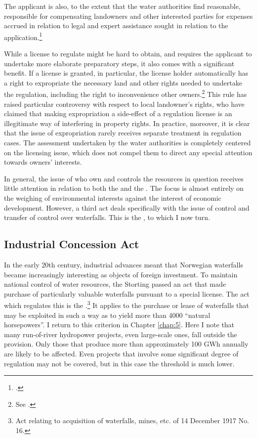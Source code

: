 The applicant is also, to the extent that the water authorities find reasonable, responsible for compensating landowners and other interested parties for expenses accrued in relation to legal and expert assistance sought in relation to the application.\footcite[6]{wra17} 

While a license to regulate might be hard to obtain, and requires the applicant to undertake more elaborate preparatory steps, it also comes with a significant benefit. If a license is granted, in particular, the license holder automatically has a right to expropriate the necessary land and other rights needed to undertake the regulation, including the right to inconvenience other owners.\footnote{See \cite[16]{wra17}.} This rule has raised particular controversy with respect to local landowner's rights, who have claimed that making expropriation a side-effect of a regulation license is an illegitimate way of interfering in property rights. In practice, moreover, it is clear that the issue of expropriation rarely receives separate treatment in regulation cases. The assessment undertaken by the water authorities is completely centered on the licensing issue, which does not compel them to direct any special attention towards owners' interests. 

In general, the issue of who own and controls the resources in question receives little attention in relation to both the \cite{wwra17} and the \cite{wra00}. The focus is almost entirely on the weighing of environmental interests against the interest of economic development. However, a third act deals specifically with the issue of control and transfer of control over waterfalls. This is the \cite{ica17}, to which I now turn. 

\subsection{Industrial Concession Act}

In the early 20th century, industrial advances meant that Norwegian waterfalls became increasingly interesting as objects of foreign investment. To maintain national control of water resources, the Storting passed an act that made purchase of particularly valuable waterfalls pursuant to a special license. The act which regulates this is the \cite{ica17}.\footnote{Act relating to acquisition of waterfalls, mines, etc. of 14 December 1917 No. 16.} It applies to the purchase or lease of waterfalls that may be exploited in such a way as to yield more than 4000 ``natural horsepowers''. I return to this criterion in Chapter \ref{chap:5}. Here I note that many run-of-river hydropower projects, even large-scale ones, fall outside the provision. Only those that produce more than approximately 100 GWh annually are likely to be affected. Even projects that involve some significant degree of regulation may not be covered, but in this case the threshold is much lower. 

